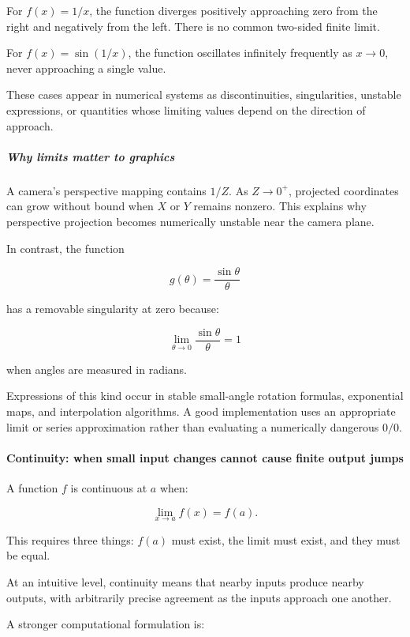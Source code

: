 For \(f(x)=1/x\), the function diverges positively approaching zero from the right and negatively from the left. There is no common two-sided finite limit.

For \(f(x)=\sin(1/x)\), the function oscillates infinitely frequently as \(x\to0\), never approaching a single value.

These cases appear in numerical systems as discontinuities, singularities, unstable expressions, or quantities whose limiting values depend on the direction of approach.

\subparagraph{Why limits matter to graphics}\label{01-foundations-i-ch020-why-limits-matter-to-graphics}

A camera's perspective mapping contains \(1/Z\). As \(Z\to0^+\), projected coordinates can grow without bound when \(X\) or \(Y\) remains nonzero. This explains why perspective projection becomes numerically unstable near the camera plane.

In contrast, the function

\[
g(\theta)=\frac{\sin\theta}{\theta}
\]

has a removable singularity at zero because:

\[
\lim_{\theta\to0}\frac{\sin\theta}{\theta}=1
\]

when angles are measured in radians.

Expressions of this kind occur in stable small-angle rotation formulas, exponential maps, and interpolation algorithms. A good implementation uses an appropriate limit or series approximation rather than evaluating a numerically dangerous \(0/0\).

\paragraph{Continuity: when small input changes cannot cause finite output jumps}\label{01-foundations-i-ch020-continuity-when-small-input-changes-cannot-cause-finite-output-jumps}

A function \(f\) is continuous at \(a\) when:

\[
\lim_{x\to a}f(x)=f(a).
\]

This requires three things: \(f(a)\) must exist, the limit must exist, and they must be equal.

At an intuitive level, continuity means that nearby inputs produce nearby outputs, with arbitrarily precise agreement as the inputs approach one another.

A stronger computational formulation is:

